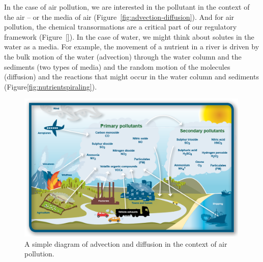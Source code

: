 \documentclass{tufte-handout}\usepackage[]{graphicx}\usepackage[]{xcolor}
\begin{document}
In the case of air pollution, we are interested in the pollutant in the context of the air -- or the media of air (Figure~\ref{fig:advection-diffusion}). And for air pollution, the chemical transormations are a critical part of our regulatory framework (Figure~\ref{}). In the case of water, we might think about solutes in the water as a media. For example, the movement of a nutrient in a river is driven by the bulk motion of the water (advection) through the water column and the sediments (two types of media) and the random motion of the molecules (diffusion) and the reactions that might occur in the water column and sediments (Figure\ref{fig:nutrientspiraling}).

\begin{figure}
\caption{A simple diagram of advection and diffusion in the context of air pollution.}
\label{fig:smog}
\centering
\includegraphics[width=0.99\textwidth]{graphics/sources-of-air-pollution-310314_orig.png}
\end{figure}
\end{document}
